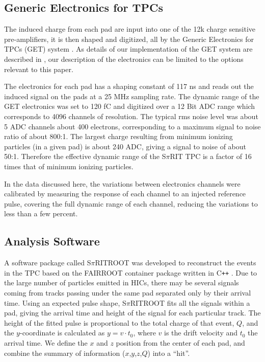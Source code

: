 \documentclass[review,number,sort&compress]{elsarticle}
\begin{document}
\subsection{Generic Electronics for TPCs}
The induced charge from each pad are input into one of the 12k charge sensitive pre-amplifiers, it is then shaped and digitized, all by the Generic Electronics for TPCs (GET) system \cite{get}. As details of our implementation of the GET system are described in \citep{aki}, our description of the electronics can be limited to the options relevant to this paper.

The electronics for each pad has a shaping constant of 117 ns and reads out the induced signal on the pads at a 25 MHz sampling rate. The dynamic range of the GET electronics was set to 120 fC and digitized over a 12 Bit ADC range which corresponds to 4096 channels of resolution. The typical rms noise level was about 5 ADC channels about 400 electrons, corresponding to a maximum signal to noise ratio of about 800:1. The largest charge resulting from minimum ionizing particles (in a given pad) is about 240 ADC, giving a signal to noise of about 50:1. Therefore the effective dynamic range of the S$\pi$RIT TPC is a factor of 16 times that of minimum ionizing particles. 

In the data discussed here, the variations between electronics channels were calibrated by measuring the response of each channel to an injected reference pulse, covering the full dynamic range of each channel, reducing the variations to less than a few percent.
 
\subsection{Analysis Software}
A software package called S$\pi$RITROOT was developed to reconstruct the events in the TPC based on the FAIRROOT container package written in C\texttt{++} \cite{fairroot}. Due to the large number of particles emitted in HICs, there may be several signals coming from tracks passing under the same pad separated only by their arrival time. Using an expected pulse shape, S$\pi$RITROOT fits all the signals within a pad, giving the arrival time and height of the signal for each particular track. The height of the fitted pulse is proportional to the total charge of that event, $Q$, and the $y$-coordinate is calculated as $y = v\cdot t_0$, where $v$ is the drift velocity and $t_0$ the arrival time. We define the $x$ and $z$ position from the center of each pad, and combine the summary of information ($x$,$y$,$z$,$Q$) into a ``hit''. 
\end{document}
